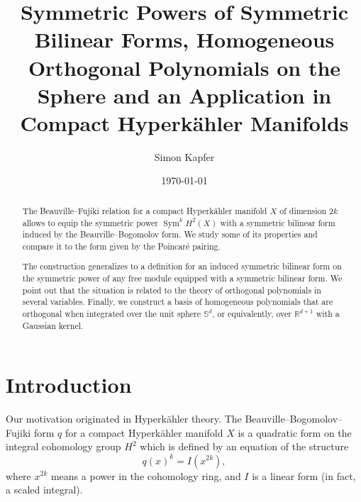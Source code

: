 \documentclass{amsart}
\DeclareMathOperator{\Sym}{Sym}
\newcommand{\R}{\mathbb{R}}
\renewcommand{\S}{\mathbb{S}}
\theoremstyle{plain}
\theoremstyle{definition}
\theoremstyle{remark}
\begin{document}
\title[Symmetric Powers, Hom.~Orth.~Polynomials, Hyperk\"ahlers]{Symmetric Powers of Symmetric Bilinear Forms, Homogeneous Orthogonal Polynomials on the Sphere and an Application in Compact Hyperk\"ahler Manifolds}


\author{Simon Kapfer}
\address{Simon Kapfer, Laboratoire de Math\'ematiques et Applications, UMR CNRS 6086, Universit\'e de Poitiers, T\'el\'eport 2, Boulevard Marie et Pierre Curie, F-86962 Futuroscope Chasseneuil}


\date{\today}


\begin{abstract} The Beauville--Fujiki relation for a compact Hyperk\"ahler manifold $X$ of dimension $2k$ allows to equip the symmetric power $\Sym^kH^2(X)$ with a symmetric bilinear form induced by the Beauville--Bogomolov form. We study some of its properties and compare it to the form given by the Poincar\'e pairing.

The construction generalizes to a definition for an induced symmetric bilinear form on the symmetric power of any free module equipped with a symmetric bilinear form. We point out that the situation is related to the theory of orthogonal polynomials in several variables.
Finally, we construct a basis of homogeneous polynomials that are orthogonal when integrated over the unit sphere $\S^d$, or equivalently, over $\R^{d+1}$ with a Gaussian kernel.
\end{abstract}

\maketitle


\section{Introduction}
Our motivation originated in Hyperk\"ahler theory. The Beauville--Bogomolov--Fujiki form $q$ for a compact Hyperk\"ahler manifold $X$ is a quadratic form on the integral cohomology group $H^2$ which is defined by an equation of the structure
\begin{equation} \label{initialeq}
q(x)^k = I(x^{2k}),
\end{equation}
where $x^{2k}$ means a power in the cohomology ring, and $I$ is a linear form (in fact, a scaled integral). 
\end{document}

